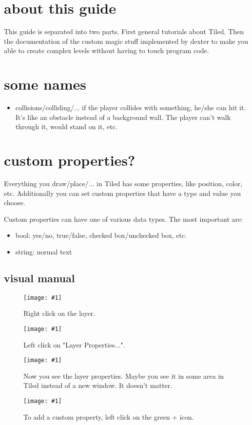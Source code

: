 \documentclass{article}
\newcommand{\erklaerbild}[2]{
	\begin{figure}[H]
		\center
		\texttt{[image: \#1]}
		\caption{#2}
	\end{figure}
}
\begin{document}
\tableofcontents

\section{about this guide}
This guide is separated into two parts. First general tutorials about Tiled. Then the documentation of the custom magic stuff implemented by dexter to make you able to create complex levels without having to touch program code.

\section{some names}
\begin{itemize}
	\item collisions/colliding/... if the player collides with something, he/she can hit it. It's like an obstacle instead of a background wall. The player can't walk through it, would stand on it, etc.
\end{itemize}

\section{custom properties?}
Everything you draw/place/... in Tiled has some properties, like position, color, etc. Additionally you can set custom properties that have a type and value you choose.

Custom properties can have one of various data types. The most important are:
\begin{itemize}
	\item bool: yes/no, true/false, checked box/unchecked box, etc.
	\item string: normal text
\end{itemize}

\subsection{visual manual}
\erklaerbild
	{custom_prop_1_edit.png}
	{Right click on the layer.}

\erklaerbild
	{custom_prop_2_edit.png}
	{Left click on "Layer Properties...".}

\erklaerbild
	{custom_prop_3.png}
	{Now you see the layer properties. Maybe you see it in some area in Tiled instead of a new window. It doesn't matter.}

\erklaerbild
	{custom_prop_4_edit.png}
	{To add a custom property, left click on the green + icon.}
\end{document}
